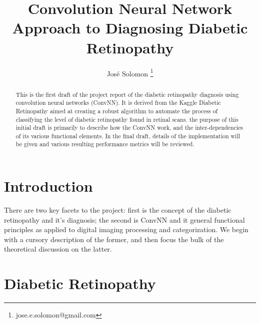 \documentclass[letterpaper,12pt]{article}
\title{Convolution Neural Network Approach to Diagnosing Diabetic Retinopathy}
\author{Jos\'e Solomon \thanks{jose.e.solomon@gmail.com} }
\date{}
\begin{document}
\maketitle
\begin{abstract}
This is the first draft of the project report of the diabetic retinopathy diagnosis using convolution neural networks (ConvNN). It is derived from the Kaggle Diabetic Retinopathy \cite{kaggle} aimed at creating a robust algorithm to automate the process of classifying the level of diabetic retinopathy found in retinal scans. the purpose of this initial draft is primarily to describe how the ConvNN work, and the inter-dependencies  of its various functional elements. In the final draft, details of the implementation will be given and various resulting performance metrics will be reviewed.
\end{abstract}
\tableofcontents

\section{Introduction}

There are two key facets to the project: first is the concept of the diabetic retinopathy and it's diagnosis; the second is ConvNN and it general functional principles as applied to digital imaging processing and categorization. We begin with a cursory description of the former, and then focus the bulk of the theoretical discussion on the latter.

\section{Diabetic Retinopathy}
\end{document}
